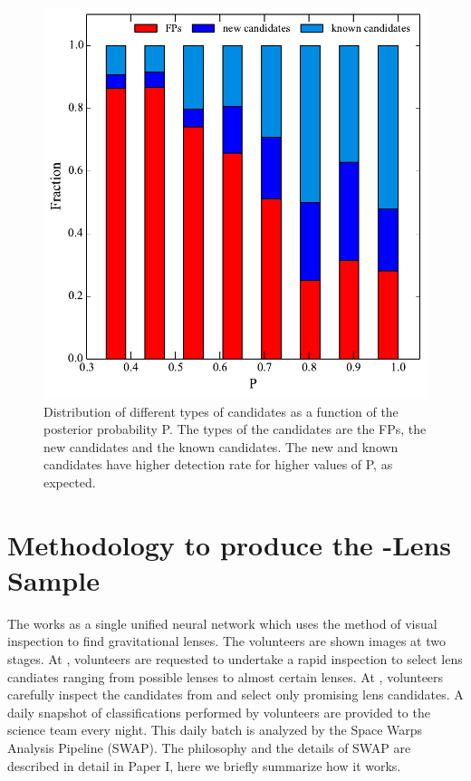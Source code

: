 \documentclass[useAMS,usenatbib,a4paper]{mn2e}
\begin{document}
\begin{figure}
\begin{center}
\includegraphics[scale=0.6]{sw-cfhtls-figs/cand_fp_P_frac.pdf}
\caption{ \label{fig:stackP}
Distribution of different types of candidates as a function of the posterior
probability P. The types of the candidates are the FPs, the new candidates and
the known candidates. The new and known candidates have higher detection rate
for higher values of P, as expected.}
\end{center}
\end{figure}


\section{Methodology to produce the \sw-\cfhtls Lens Sample}

The \sw works as a single unified neural network which uses the method of visual
inspection to find gravitational lenses. The volunteers are shown images at two
stages. At \StageOne, volunteers are requested to undertake a rapid inspection to
select lens candiates ranging from possible lenses to almost certain lenses. At
\StageTwo, volunteers carefully inspect the candidates from \StageOne and select only
promising lens candidates. A daily snapshot of classifications performed by
volunteers are provided to the science team every night. This daily batch is
analyzed by the Space Warps Analysis Pipeline (SWAP). The philosophy and the
details of SWAP are described in detail in Paper I, here we briefly summarize
how it works.
\end{document}
